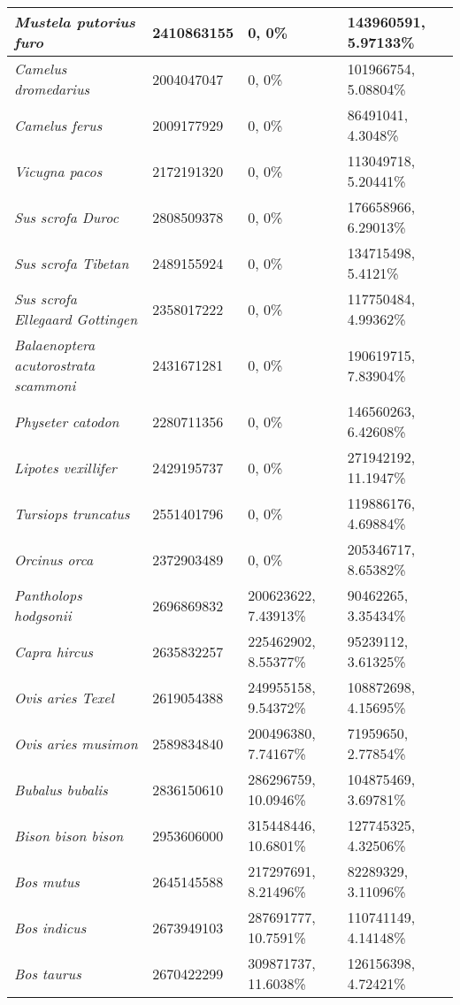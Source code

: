 {\begin{longtable}{| L{4cm} | L{2.7cm}  | L{3.7cm} | L{3.7cm} |}
\textit{Mustela putorius furo} & 2410863155 & 0, 0\% & 143960591, 5.97133\% \\ \hline
\textit{Camelus dromedarius} & 2004047047 & 0, 0\% & 101966754, 5.08804\% \\ \hline
\textit{Camelus ferus} & 2009177929 & 0, 0\% & 86491041, 4.3048\% \\ \hline
\textit{Vicugna pacos} & 2172191320 & 0, 0\% & 113049718, 5.20441\% \\ \hline
\textit{Sus scrofa Duroc} & 2808509378 & 0, 0\% & 176658966, 6.29013\% \\ \hline
\textit{Sus scrofa Tibetan} & 2489155924 & 0, 0\% & 134715498, 5.4121\% \\ \hline
\textit{Sus scrofa Ellegaard Gottingen} & 2358017222 & 0, 0\% & 117750484, 4.99362\% \\ \hline
\textit{Balaenoptera acutorostrata scammoni} & 2431671281 & 0, 0\% & 190619715, 7.83904\% \\ \hline
\textit{Physeter catodon} & 2280711356 & 0, 0\% & 146560263, 6.42608\% \\ \hline
\textit{Lipotes vexillifer} & 2429195737 & 0, 0\% & 271942192, 11.1947\% \\ \hline
\textit{Tursiops truncatus} & 2551401796 & 0, 0\% & 119886176, 4.69884\% \\ \hline
\textit{Orcinus orca} & 2372903489 & 0, 0\% & 205346717, 8.65382\% \\ \hline
\textit{Pantholops hodgsonii} & 2696869832 & 200623622, 7.43913\% & 90462265, 3.35434\% \\ \hline
\textit{Capra hircus} & 2635832257 & 225462902, 8.55377\% & 95239112, 3.61325\% \\ \hline
\textit{Ovis aries Texel} & 2619054388 & 249955158, 9.54372\% & 108872698, 4.15695\% \\ \hline
\textit{Ovis aries musimon} & 2589834840 & 200496380, 7.74167\% & 71959650, 2.77854\% \\ \hline
\textit{Bubalus bubalis} & 2836150610 & 286296759, 10.0946\% & 104875469, 3.69781\% \\ \hline
\textit{Bison bison bison} & 2953606000 & 315448446, 10.6801\% & 127745325, 4.32506\% \\ \hline
\textit{Bos mutus} & 2645145588 & 217297691, 8.21496\% & 82289329, 3.11096\% \\ \hline
\textit{Bos indicus} & 2673949103 & 287691777, 10.7591\% & 110741149, 4.14148\% \\ \hline
\textit{Bos taurus} & 2670422299 & 309871737, 11.6038\% & 126156398, 4.72421\% \\ \hline

\end{longtable}}
